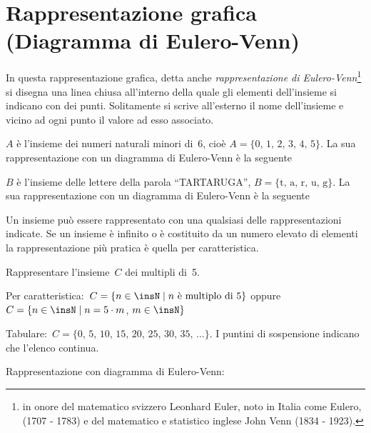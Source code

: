 \ovalbox{\risolvii \ref{ese:6.5}, \ref{ese:6.6}, \ref{ese:6.7}, \ref{ese:6.8}, \ref{ese:6.9}, \ref{ese:6.10}, \ref{ese:6.11}, \ref{ese:6.12}, \ref{ese:6.13}, \ref{ese:6.14}, \ref{ese:6.15},%
\ref{ese:6.16}, \ref{ese:6.17}, \ref{ese:6.18}}

\section{Rappresentazione grafica (Diagramma di Eulero-Venn)}

In questa rappresentazione grafica, detta anche \textit{rappresentazione
di Eulero-Venn}\footnote{in onore del matematico svizzero Leonhard Euler, noto in Italia come Eulero, (1707 - 1783) e del matematico e statistico inglese John Venn (1834 - 1923).} si disegna una linea chiusa all'interno della quale gli elementi
dell'insieme si indicano con dei punti. Solitamente si scrive all'esterno il nome dell'insieme
e vicino ad ogni punto il valore ad esso associato.

\begin{exrig}
 \begin{esempio}
 $A$ è l'insieme dei numeri naturali minori di~6, cioè $A=\{\text{0, 1, 2, 3, 4, 5}\}$.
 La sua rappresentazione con un diagramma di Eulero-Venn è la seguente
 \begin{center}
  
 \end{center}

 \end{esempio}

 \begin{esempio}
 $B$ è l'insieme delle lettere della parola ``TARTARUGA'', $B=\{\text{t, a, r, u, g}\}$.
 La sua rappresentazione con un diagramma di Eulero-Venn è la seguente
 \begin{center}
  
 \end{center}

 \end{esempio}

\end{exrig}

Un insieme può essere rappresentato con una qualsiasi delle
rappresentazioni indicate. Se un insieme è infinito o è costituito
da un numero elevato di elementi la rappresentazione più pratica è
quella per caratteristica.

\begin{exrig}
 \begin{esempio}
 Rappresentare l'insieme~$C$ dei multipli di~5.

 Per caratteristica:~$C=\{n\in\insN\mid n\text{ è multiplo di }5\}$ oppure
$C=\{n\in\insN\mid n=5\cdot m$, $m\in\insN\}$

Tabulare:~$C=\{\text{0, 5, 10, 15, 20, 25, 30, 35, }\dots\}$. I puntini di sospensione indicano che l'elenco continua.

Rappresentazione con diagramma di Eulero-Venn:
\begin{center}
 
\end{center}
 \end{esempio}
\end{exrig}

\ovalbox{\risolvii \ref{ese:6.19}, \ref{ese:6.20}, \ref{ese:6.21}, \ref{ese:6.22}, \ref{ese:6.23}, \ref{ese:6.24}, \ref{ese:6.25}, \ref{ese:6.26}}

\newpage

\cleardoublepage

